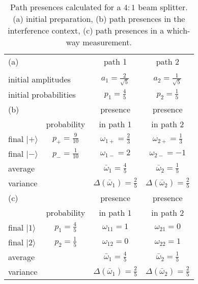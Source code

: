 \documentclass[english,keywords,aps,twocolumn]{revtex4-1}
\begin{document}
\begin{table}
\begin{tabular}{ l | c | c c }
 \multicolumn{2}{l|}{(a)}  & path 1 & path 2 \\ 
 \multicolumn{2}{l|}{   }  &        &        \\[-10pt]
\hline
 \multicolumn{2}{l|}{initial amplitudes} & $a_1=\frac 2 {\sqrt 5}$ & $a_2=\frac 1 {\sqrt 5}$\\
 \multicolumn{2}{l|}{initial probabilities} & $p_1=\frac 4 5 $ & $ p_2=\frac 1 5$ \vspace{16pt}\\
(b)& & presence & presence \\[-4pt]
& probability & in path 1 & in path 2 \\
  \hline
 final $|+\rangle$ & $p_+=\frac 9 {10}$ & $\omega_{1+}=\frac 2 3$ & $\omega_{2+}=\frac 1 3$ \\
 final $|-\rangle$  & $p_-=\frac 1 {10}$ & $\omega_{1-}=2             $ & $\omega_{2-}=-1$ \\
  average& & $\bar \omega_1 = \frac 4 5 $ & $ \bar \omega_2=\frac 1 5$\\
  variance& & $\mathit\Delta(\bar \omega_1) = \frac 2 5 $ & $ \mathit\Delta(\bar \omega_2)=\frac 2 5$ \vspace{16pt}\\
(c)& & presence & presence \\[-4pt]
& probability & in path 1 & in path 2 \\
  \hline
 final $|1\rangle$ & $p_1=\frac 4 5$ & $\omega_{11}=1$ & $\omega_{21}=0$\\
 final $|2\rangle$ & $p_2=\frac 1 5$ & $\omega_{12}=0$ & $\omega_{22}=1$\\
  average& & $\bar \omega_1 = \frac 4 5 $ & $ \bar \omega_2=\frac 1 5$\\
  variance& & $\mathit\Delta(\bar \omega_1) = \frac 2 5 $ & $ \mathit\Delta(\bar \omega_2)=\frac 2 5$\vspace{5pt}
\end{tabular}
\caption{Path presences calculated for a $4:1$ beam splitter. (a) initial preparation, (b) path presences in the interference context, (c) path presences in a which-way measurement.	}\label{tab:pathPresences}
\end{table}
\end{document}
